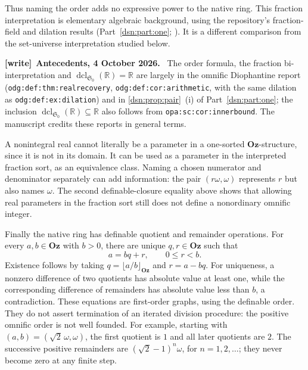 \documentclass[11pt,a4paper]{article}
\numberwithin{equation}{section}
\theoremstyle{definition}
\theoremstyle{remark}
\newcommand{\Oz}{\mathbf{Oz}}
\newcommand{\R}{\mathbb R}
\newcommand{\dcl}{\operatorname{dcl}}
\newcommand{\lbl}[1]{\nolinkurl{#1}}
\newenvironment{writenote}[1][]{\par\medskip\begingroup\small\noindent\textbf{[write]}\if\relax\detokenize{#1}\relax\else~\textbf{#1.}\fi~\ignorespaces}{\par\endgroup\medskip}
\newcommand{\Szero}{\mathfrak S_0}
\begin{document}
Thus naming the order adds no expressive power to the native ring.
This fraction interpretation is elementary algebraic background,
using the repository's fraction-field and dilation results
(Part~\ref{dsn:part:one}; \cite{RepoOdg,RepoOpa}).  It is a different comparison from
the set-universe interpretation studied below.
\begin{writenote}[Antecedents, 4 October 2026]
The order formula, the fraction bi-interpretation and $\dcl_{\Szero}(\R)=\R$
are largely in the omnific Diophantine report
(\lbl{odg:def:thm:realrecovery}, \lbl{odg:def:cor:arithmetic}, with the same
dilation as \lbl{odg:def:ex:dilation}) and in \cref{dsn:prop:pair}~(i) of
Part~\ref{dsn:part:one}; the inclusion $\dcl_{\Szero}(\R)\subseteq\R$ also
follows from \lbl{opa:sc:cor:innerbound}. The manuscript credits these
reports in general terms.
\end{writenote}


A nonintegral real cannot literally be a parameter in a one-sorted
\(\Oz\)-structure, since it is not in its domain.  It can be used
as a parameter in the interpreted fraction sort, as an equivalence
class.  Naming a chosen numerator and denominator separately can add
information: the pair \((r\omega,\omega)\) represents \(r\) but
also names \(\omega\).  The second definable-closure equality above
shows that allowing real parameters in the fraction sort still does
not define a nonordinary omnific integer.

Finally the native ring has definable quotient and remainder operations.
For every \(a,b\in\Oz\) with \(b>0\), there are unique \(q,r\in\Oz\)
such that
\[
 a=bq+r,\qquad 0\le r<b.
\]
Existence follows by taking \(q=\lfloor a/b\rfloor_{\Oz}\) and
\(r=a-bq\).  For uniqueness, a nonzero difference of two quotients
has absolute value at least one, while the corresponding difference
of remainders has absolute value less than \(b\), a contradiction.
These equations are first-order graphs, using the definable order.
They do not assert termination of an iterated division procedure:
the positive omnific order is not well founded.  For example, starting
with \((a,b)=(\sqrt2\,\omega,\omega)\), the first quotient is \(1\)
and all later quotients are \(2\).  The successive positive remainders
are \((\sqrt2-1)^n\omega\), for \(n=1,2,\ldots\); they never become
zero at any finite step.
\end{document}

